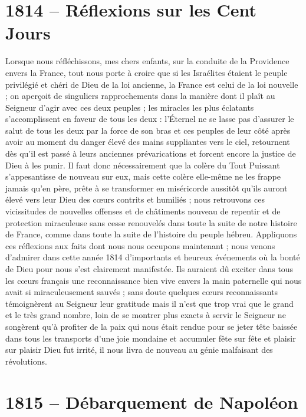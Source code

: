 \documentclass[11pt,a4paper]{report}
\begin{document}
\section*{1814 -- Réflexions sur les Cent Jours}

Lorsque nous réfléchissons, mes chers enfants, sur la conduite de la Providence envers la France, tout nous porte à croire que si les Israélites étaient le peuple privilégié et chéri de Dieu de la loi ancienne, la France est celui de la loi nouvelle ; on aperçoit de singuliers rapprochements dans la manière dont il plaît au Seigneur d'agir avec ces deux peuples ; les miracles les plus éclatants s'accomplissent en faveur de tous les deux : l'Éternel ne se lasse pas d'assurer le salut de tous les deux par la force de son bras et ces peuples de leur côté après avoir au moment du danger élevé des mains suppliantes vers le ciel, retournent dès qu'il est passé à leurs anciennes prévarications et forcent encore la justice de Dieu à les punir. Il faut donc nécessairement que la colère du Tout Puissant s'appesantisse de nouveau sur eux, mais cette colère elle-même ne les frappe jamais qu'en père, prête à se transformer en miséricorde aussitôt qu'ils auront élevé vers leur Dieu des cœurs contrits et humiliés ; nous retrouvons ces vicissitudes de nouvelles offenses et de châtiments nouveau de repentir et de protection miraculeuse sans cesse renouvelés dans toute la suite de notre histoire de France, comme dans toute la suite de l'histoire du peuple hébreu. Appliquons ces réflexions aux faits dont nous nous occupons maintenant ; nous venons d'admirer dans cette année 1814 d'importants et heureux événements où la bonté de Dieu pour nous s'est clairement manifestée. Ils auraient dû exciter dans tous les cœurs français une reconnaissance bien vive envers la main paternelle qui nous avait si miraculeusement sauvés ; sans doute quelques cœurs reconnaissants témoignèrent au Seigneur leur gratitude mais il n'est que trop vrai que le grand et le très grand nombre, loin de se montrer plus exacts à servir le Seigneur ne songèrent qu'à profiter de la paix qui nous était rendue pour se jeter tête baissée dans tous les transports d'une joie mondaine et accumuler fête sur fête et plaisir sur plaisir Dieu fut irrité, il nous livra de nouveau au génie malfaisant des révolutions.

\section*{1815 -- Débarquement de Napoléon}
\end{document}
